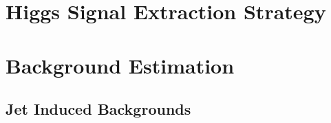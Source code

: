 \documentclass{cmspaper}
\begin{document}
\section{Higgs Signal Extraction Strategy}
   
   \label{sec:signal_selection}
%      
%     

\section{Background Estimation}
     \label{sec:backgrounds}
     
%     
   \subsection{Jet Induced Backgrounds}
     \label{sec:bkg_fakes}
     
%     
%     
%      
\end{document}
